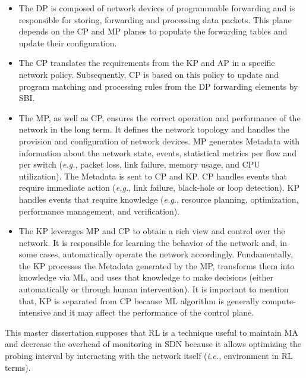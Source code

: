 \begin{itemize}
    \item The DP is composed of network devices of programmable forwarding and is responsible for storing, forwarding and processing data packets. This plane depends on the CP and MP planes to populate the forwarding tables and update their configuration.
    
    \item The CP translates the requirements from the KP and AP in a specific network policy. Subsequently, CP is based on this policy to update and program matching and processing rules from the DP forwarding elements by SBI.
    
    \item The MP, as well as CP, ensures the correct operation and performance of the network in the long term. It defines the network topology and handles the provision and configuration of network devices. MP generates Metadata with information about the network state, events, statistical metrics per flow and per switch (\textit{e.g.}, packet loss, link failure, memory usage, and CPU utilization). The Metadata is sent to CP and KP. CP handles events that require immediate action (\textit{e.g.}, link failure, black-hole or loop detection). KP handles events that require knowledge (\textit{e.g.}, resource planning, optimization, performance management, and verification).
    
    \item The KP leverages MP and CP to obtain a rich view and control over the network. It is responsible for learning the behavior of the network and, in some cases, automatically operate the network accordingly. Fundamentally, the KP processes the Metadata generated by the MP, transforms them into knowledge via ML, and uses that knowledge to make decisions (either automatically or through human intervention). It is important to mention that, KP is separated from CP because ML algorithm is generally compute-intensive and it may affect the performance of the control plane.

\end{itemize}

This master dissertation supposes that RL is a technique useful to maintain MA and decrease the overhead of monitoring in SDN because it allows optimizing the probing interval by interacting with the network itself (\textit{i.e.,} environment in RL terms).\\

